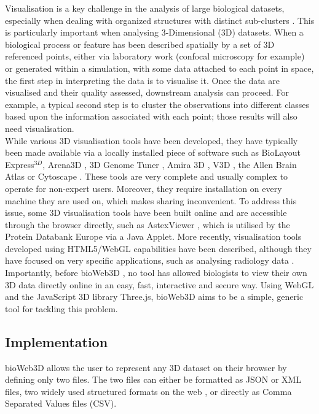 Visualisation is a key challenge in the analysis of large biological datasets, especially when dealing with organized structures with distinct sub-clusters \cite{Rubel10}. This is particularly important when analysing 3-Dimensional (3D) datasets. When a biological process or feature has been described spatially by a set of 3D referenced points, either via laboratory work (confocal microscopy for example) or generated within a simulation, with some data attached to each point in space, the first step in interpreting the data is to visualise it. Once the data are visualised and their quality assessed, downstream analysis can proceed. For example, a typical second step is to cluster the observations into different classes based upon the information associated with each point; those results will also need visualisation. \\

While various 3D visualisation tools have been developed, they have typically been made available via a locally installed piece of software such as BioLayout Express$^{3D}$\cite{Freeman07}, Arena3D \cite{Pavlopoulos08},  3D Genome Tuner \cite{Wang093D}, Amira 3D \cite{Stalling05}, V3D \cite{Peng10}, the Allen Brain Atlas \cite{Lein07} or Cytoscape \cite{Shannon03}. These tools are very complete and usually complex to operate for non-expert users. Moreover, they require installation on every machine they are used on, which makes sharing inconvenient. To address this issue, some 3D visualisation tools have been built online and are accessible through the browser directly, such as AstexViewer \cite{Hartshorn02}, which is utilised by the Protein Databank Europe via a Java Applet. More recently, visualisation tools developed using HTML5/WebGL capabilities have been described, although they have focused on very specific applications, such as analysing radiology data  \cite{Dinesh12}.\\

Importantly, before bioWeb3D \cite{Pettit13}, no tool has allowed biologists to view their own 3D data directly online in an easy, fast, interactive and secure way. Using WebGL and the JavaScript 3D library Three.js, bioWeb3D aims to be a simple, generic tool for tackling this problem.\\

	\subsection{Implementation}

bioWeb3D allows the user to represent any 3D dataset on their browser by defining only two files. The two files can either be formatted as JSON or XML files, two widely used structured formats on the web \cite{Wilde07} \cite{xmlref}, or directly as Comma Separated Values files (CSV).\\


